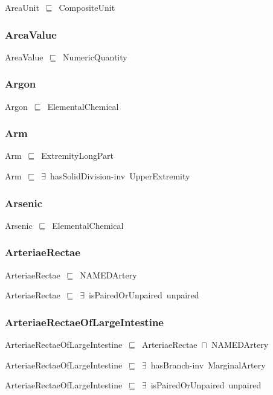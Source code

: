 \documentclass{article}
\begin{document}
AreaUnit~\ensuremath{\sqsubseteq}~CompositeUnit~

\subsubsection*{AreaValue}

AreaValue~\ensuremath{\sqsubseteq}~NumericQuantity~

\subsubsection*{Argon}

Argon~\ensuremath{\sqsubseteq}~ElementalChemical~

\subsubsection*{Arm}

Arm~\ensuremath{\sqsubseteq}~ExtremityLongPart~

Arm~\ensuremath{\sqsubseteq}~\ensuremath{\exists}~hasSolidDivision-inv~UpperExtremity~

\subsubsection*{Arsenic}

Arsenic~\ensuremath{\sqsubseteq}~ElementalChemical~

\subsubsection*{ArteriaeRectae}

ArteriaeRectae~\ensuremath{\sqsubseteq}~NAMEDArtery~

ArteriaeRectae~\ensuremath{\sqsubseteq}~\ensuremath{\exists}~isPairedOrUnpaired~unpaired~

\subsubsection*{ArteriaeRectaeOfLargeIntestine}

ArteriaeRectaeOfLargeIntestine~\ensuremath{\sqsubseteq}~ArteriaeRectae~\ensuremath{\sqcap}~NAMEDArtery~

ArteriaeRectaeOfLargeIntestine~\ensuremath{\sqsubseteq}~\ensuremath{\exists}~hasBranch-inv~MarginalArtery~

ArteriaeRectaeOfLargeIntestine~\ensuremath{\sqsubseteq}~\ensuremath{\exists}~isPairedOrUnpaired~unpaired~
\end{document}
